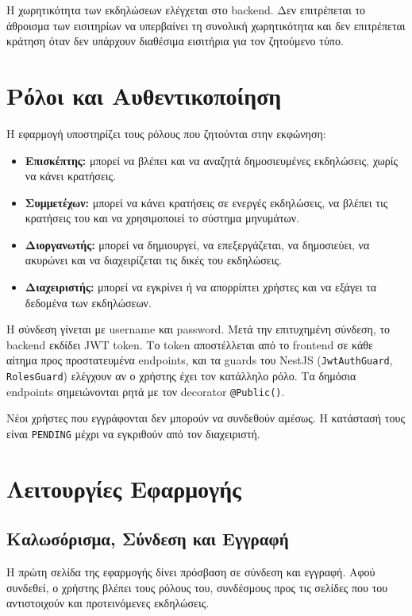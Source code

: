 \documentclass[11pt,a4paper]{article}
\newcommand{\code}[1]{\texttt{#1}}
\begin{document}
Η χωρητικότητα των εκδηλώσεων ελέγχεται στο backend. Δεν επιτρέπεται το άθροισμα των
εισιτηρίων να υπερβαίνει τη συνολική χωρητικότητα και δεν επιτρέπεται κράτηση όταν δεν
υπάρχουν διαθέσιμα εισιτήρια για τον ζητούμενο τύπο.

\section{Ρόλοι και Αυθεντικοποίηση}

Η εφαρμογή υποστηρίζει τους ρόλους που ζητούνται στην εκφώνηση:
\begin{itemize}
  \item \textbf{Επισκέπτης:} μπορεί να βλέπει και να αναζητά δημοσιευμένες εκδηλώσεις,
    χωρίς να κάνει κρατήσεις.
  \item \textbf{Συμμετέχων:} μπορεί να κάνει κρατήσεις σε ενεργές εκδηλώσεις, να βλέπει
    τις κρατήσεις του και να χρησιμοποιεί το σύστημα μηνυμάτων.
  \item \textbf{Διοργανωτής:} μπορεί να δημιουργεί, να επεξεργάζεται, να δημοσιεύει, να
    ακυρώνει και να διαχειρίζεται τις δικές του εκδηλώσεις.
  \item \textbf{Διαχειριστής:} μπορεί να εγκρίνει ή να απορρίπτει χρήστες και να εξάγει
    τα δεδομένα των εκδηλώσεων.
\end{itemize}

Η σύνδεση γίνεται με username και password. Μετά την επιτυχημένη σύνδεση, το backend
εκδίδει JWT token. Το token αποστέλλεται από το frontend σε κάθε αίτημα προς
προστατευμένα endpoints, και τα guards του NestJS (\code{JwtAuthGuard},
\code{RolesGuard}) ελέγχουν αν ο χρήστης έχει τον κατάλληλο ρόλο. Τα δημόσια endpoints
σημειώνονται ρητά με τον decorator \code{@Public()}.

Νέοι χρήστες που εγγράφονται δεν μπορούν να συνδεθούν αμέσως. Η κατάστασή τους είναι
\code{PENDING} μέχρι να εγκριθούν από τον διαχειριστή.

\section{Λειτουργίες Εφαρμογής}

\subsection{Καλωσόρισμα, Σύνδεση και Εγγραφή}

Η πρώτη σελίδα της εφαρμογής δίνει πρόσβαση σε σύνδεση και εγγραφή. Αφού συνδεθεί, ο
χρήστης βλέπει τους ρόλους του, συνδέσμους προς τις σελίδες που του αντιστοιχούν και
προτεινόμενες εκδηλώσεις.
\end{document}
